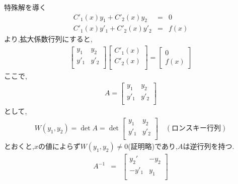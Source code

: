\documentclass[a4paper]{jsarticle}
\begin{document}
\begin{itembox}[l]{特殊解を導く}
    \begin{eqnarray*}
        C'_1\left(x\right)y_1+C'_2\left(x\right)y_2&=&0\\
        C'_1\left(x\right)y'_1+C'_2\left(x\right)y'_2&=&f\left(x\right)
    \end{eqnarray*}
    より,拡大係数行列にすると,
    \begin{eqnarray*}
        \begin{bmatrix}
            y_1  & y_2  \\
            y'_1 & y'_2 \\
        \end{bmatrix}
        \begin{bmatrix}
            C'_1\left(x\right) \\
            C'_2\left(x\right) \\
        \end{bmatrix}
        =
        \begin{bmatrix}
            0 \\
            f\left(x\right)
        \end{bmatrix}
    \end{eqnarray*}
    ここで,
    \begin{eqnarray*}
        A=
        \begin{bmatrix}
            y_1  & y_2  \\
            y'_1 & y'_2 \\
        \end{bmatrix}
    \end{eqnarray*}
    として,
    \begin{eqnarray*}
        W\left(y_1,y_2\right)
        =\det A
        =\det
        \begin{bmatrix}
            y_1  & y_2  \\
            y'_1 & y'_2 \\
        \end{bmatrix}
        \quad (ロンスキー行列)
    \end{eqnarray*}
    とおくと,$x$の値によらず$W\left(y_1,y_2\right)\neq 0$(証明略)であり,$A$は逆行列を持つ.\\
    \begin{eqnarray*}
        A^{-1}&=&
        \begin{bmatrix}
            y_2'  & -y_2 \\
            -y'_1 & y_1  \\
        \end{bmatrix}\\

\end{eqnarray*}
\end{itembox}
\end{document}
